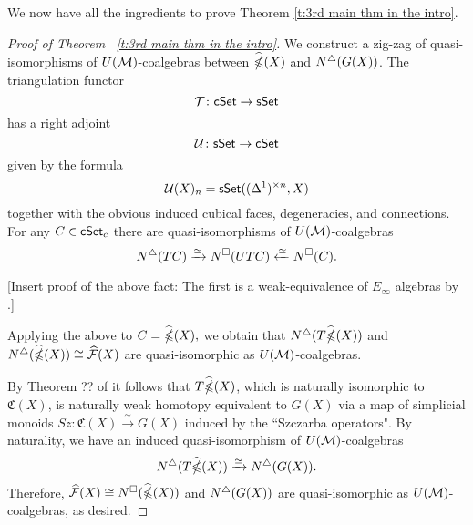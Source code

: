 We now have all the ingredients to prove Theorem \ref{t:3rd main thm in the intro}.
\begin{proof}[Proof of Theorem ~\ref{t:3rd main thm in the intro}]

We construct a zig-zag of quasi-isomorphisms of $U(\mathcal{M})$-coalgebras between $\widehat{\mathbb{\Omega}}(X)$ and $N^{\triangle} (G(X))$.
The triangulation functor $$\mathcal{T}\colon \mathsf{cSet} \to \mathsf{sSet}$$
has a right adjoint $$\mathcal{U}\colon \mathsf{sSet} \to \mathsf{cSet}$$
given by the formula
$$\mathcal{U}(X)_n= \mathsf{sSet}((\Delta^1)^{\times n}, X)$$
together with the obvious induced cubical faces, degeneracies, and connections. For any $C \in \mathsf{cSet}_c$ there are quasi-isomorphisms of $U(\mathcal{M})$-coalgebras
$$N^{\triangle}(TC) \xrightarrow{\simeq} N^{\square}(UTC) \xleftarrow{\simeq} N^{\square}(C).$$

[Insert proof of the above fact: The first is a weak-equivalence of $E_\infty$ algebras by \cite{medina2021cubical}.]

Applying the above to $C= \widehat{\mathbb{\Omega}}(X),$ we obtain that $N^{\triangle}(T\widehat{\mathbb{\Omega}}(X))$ and $N^{\triangle}(\widehat{\mathbb{\Omega}}(X)) \cong \widehat{\mathcal{F}}(X)$ are quasi-isomorphic as $U(\mathcal{M})$-coalgebras. 

By Theorem ?? of \cite{minichello-rivera-zeinalian} it follows that $T\widehat{\mathbb{\Omega}}(X)$, which is naturally isomorphic to $\mathfrak{C}(X)$, is naturally weak homotopy equivalent to $G(X)$ via a map of simplicial monoids $Sz \colon \mathfrak{C}(X) \xrightarrow{\simeq} G(X)$ induced by the ``Szczarba operators". By naturality, we have an induced quasi-isomorphism of $U(\mathcal{M})$-coalgebras
$$N^{\triangle}(T\widehat{\mathbb{\Omega}}(X)) \xrightarrow{\simeq} N^{\triangle}(G(X)).$$
Therefore, $\widehat{\mathcal{F}}(X) \cong N^{\square}(\widehat{\mathbb{\Omega}}(X))$ and $N^{\triangle}(G(X))$ are quasi-isomorphic as $U(\mathcal{M})$-coalgebras, as desired. 




\end{proof}